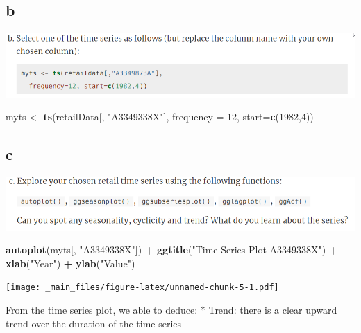\documentclass[]{book}
\newenvironment{Shaded}{\begin{snugshade}}{\end{snugshade}}
\newcommand{\DataTypeTok}[1]{\textcolor[rgb]{0.13,0.29,0.53}{#1}}
\newcommand{\DecValTok}[1]{\textcolor[rgb]{0.00,0.00,0.81}{#1}}
\newcommand{\KeywordTok}[1]{\textcolor[rgb]{0.13,0.29,0.53}{\textbf{#1}}}
\newcommand{\NormalTok}[1]{#1}
\newcommand{\OperatorTok}[1]{\textcolor[rgb]{0.81,0.36,0.00}{\textbf{#1}}}
\newcommand{\StringTok}[1]{\textcolor[rgb]{0.31,0.60,0.02}{#1}}
\begin{document}
\hypertarget{b}{%
\subsection{b}\label{b}}

\includegraphics{./week1/2.3b.png}

\begin{Shaded}
\begin{Highlighting}[]
\NormalTok{myts <-}\StringTok{ }\KeywordTok{ts}\NormalTok{(retailData[, }\StringTok{"A3349338X"}\NormalTok{],}
           \DataTypeTok{frequency =} \DecValTok{12}\NormalTok{,}
           \DataTypeTok{start=}\KeywordTok{c}\NormalTok{(}\DecValTok{1982}\NormalTok{,}\DecValTok{4}\NormalTok{))}
\end{Highlighting}
\end{Shaded}

\hypertarget{c}{%
\subsection{c}\label{c}}

\includegraphics{./week1/2.3c.png}

\begin{Shaded}
\begin{Highlighting}[]
\KeywordTok{autoplot}\NormalTok{(myts[, }\StringTok{"A3349338X"}\NormalTok{]) }\OperatorTok{+}
\StringTok{  }\KeywordTok{ggtitle}\NormalTok{(}\StringTok{"Time Series Plot A3349338X"}\NormalTok{) }\OperatorTok{+}
\StringTok{  }\KeywordTok{xlab}\NormalTok{(}\StringTok{"Year"}\NormalTok{) }\OperatorTok{+}
\StringTok{  }\KeywordTok{ylab}\NormalTok{(}\StringTok{"Value"}\NormalTok{)}
\end{Highlighting}
\end{Shaded}

\texttt{[image: \_main\_files/figure-latex/unnamed-chunk-5-1.pdf]}

From the time series plot, we able to deduce:
* Trend: there is a clear upward trend over the duration of the time series
\end{document}
